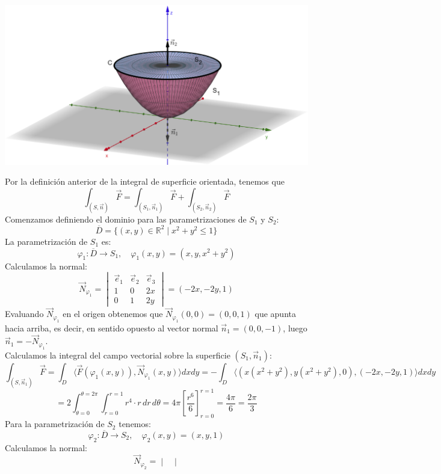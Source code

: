 {    \begin{center}
        \includegraphics[width=0.65\linewidth]{images/borde2.png}
    \end{center}
    Por la definición anterior de la integral de superficie orientada, tenemos que
    \[
        \int_{(S, \vec{n})} \vec{F} = \int_{(S_1, \vec{n}_1)} \vec{F} + \int_{(S_2, \vec{n}_2)} \vec{F}
    \]
    Comenzamos definiendo el dominio para las parametrizaciones de $S_1$ y $S_2$:
    \[
        \overline{D} = \{(x,y) \in \mathbb{R}^2 \mid x^2 + y^2 \leq 1\}
    \]
    La parametrización de $S_1$ es:
    \[
        \varphi_1 : \overline{D} \to S_1, \quad \varphi_1(x,y) = (x, y, x^2 + y^2)
    \]
    Calculamos la normal:
    \[
        \vec{N}_{\varphi_1} =
        \begin{vmatrix}
            \vec{e}_1 & \vec{e}_2 & \vec{e}_3 \\
            1         & 0         & 2x        \\
            0         & 1         & 2y
        \end{vmatrix}
        = (-2x, -2y, 1)
    \]
    Evaluando $\vec{N}_{\varphi_1}$ en el origen obtenemos que $\vec{N}_{\varphi_1}(0,0) =
        (0,0,1)$ que apunta hacia arriba, es decir, en sentido opuesto al vector normal
    $\vec{n}_1 = (0,0,-1)$, luego $\vec{n}_1 = -\vec{N}_{\varphi_1}$.\\ Calculamos
    la integral del campo vectorial sobre la superficie $(S_1, \vec{n}_1)$:
    \[
        \int_{(S, \vec{n}_1)} \vec{F} = \int_{D} \langle \vec{F}(\varphi_1(x,y)), \vec{N}_{\varphi_1}(x,y) \rangle dx dy = -\int_{D} \langle (x(x^2+y^2), y(x^2+y^2), 0), (-2x, -2y, 1) \rangle dx dy
    \]
    \[
        = 2\int_{\theta = 0}^{\theta=2\pi} \int_{r=0}^{r=1} r^4 \cdot r \, dr \, d\theta = 4\pi \left[ \frac{r^6}{6} \right]_{r=0}^{r=1} = \frac{4\pi}{6} = \frac{2\pi}{3}
    \]
    Para la parametrización de $S_2$ tenemos:
    \[
        \varphi_2 : \overline{D} \to S_2, \quad \varphi_2(x,y) = (x, y, 1)
    \]
    Calculamos la normal:
    \[
        \vec{N}_{\varphi_2} =
        \begin{vmatrix}

\end{vmatrix}\]}
